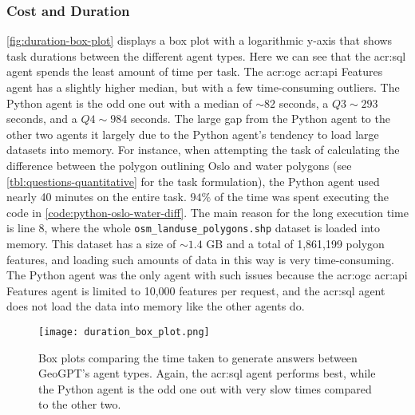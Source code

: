 \subsubsection{Cost and Duration}

\autoref{fig:duration-box-plot} displays a box plot with a logarithmic y-axis that shows task durations between the different agent types. Here we can see that the \acrshort{acr:sql} agent spends the least amount of time per task. The \acrshort{acr:ogc} \acrshort{acr:api} Features agent has a slightly higher median, but with a few time-consuming outliers. The Python agent is the odd one out with a median of $\sim 82$ seconds, a $Q3 \sim 293$ seconds, and a $Q4 \sim 984$ seconds. The large gap from the Python agent to the other two agents it largely due to the Python agent's tendency to load large datasets into memory. For instance, when attempting the task of calculating the difference between the polygon outlining Oslo and water polygons (see \autoref{tbl:questions-quantitative} for the task formulation), the Python agent used nearly 40 minutes on the entire task. $94\%$ of the time was spent executing the code in \autoref{code:python-oslo-water-diff}. The main reason for the long execution time is line 8, where the whole \texttt{osm\_landuse\_polygons.shp} dataset is loaded into memory. This dataset has a size of $\sim 1.4 \text{ GB}$ and a total of 1,861,199 polygon features, and loading such amounts of data in this way is very time-consuming. The Python agent was the only agent with such issues because the \acrshort{acr:ogc} \acrshort{acr:api} Features agent is limited to 10,000 features per request, and the \acrshort{acr:sql} agent does not load the data into memory like the other agents do.

\begin{figure}[htbp]
    \centering
    \texttt{[image: duration\_box\_plot.png]}
    \caption[Box plots comparing the time taken to generate answers between GeoGPT's agent types]{Box plots comparing the time taken to generate answers between GeoGPT's agent types. Again, the \acrshort{acr:sql} agent performs best, while the Python agent is the odd one out with very slow times compared to the other two.}
    \label{fig:duration-box-plot}
\end{figure}

\FloatBarrier

